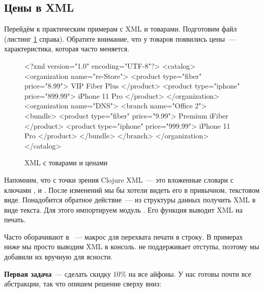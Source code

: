 \subsection{Цены в XML}


Перейдём к практическим примерам с XML и товарами. Подготовим файл
 (листинг \ref{fig:chart-xml-01} справа). Обратите
внимание, что у товаров появились цены~--- характеристика, которая часто
меняется.

\begin{figure}[ht!]

\begin{english}
  \begin{xml}
<?xml version="1.0" encoding="UTF-8"?>
<catalog>
  <organization name="re-Store">
    <product type="fiber" price="8.99">
      VIP Fiber Plus
    </product>
    <product type="iphone" price="899.99">
      iPhone 11 Pro
    </product>
  </organization>
  <organization name="DNS">
    <branch name="Office 2">
      <bundle>
        <product type="fiber" price="9.99">
          Premium iFiber
        </product>
        <product type="iphone" price="999.99">
          iPhone 11 Pro
        </product>
      </bundle>
    </branch>
  </organization>
</catalog>
  \end{xml}
\end{english}

\captionsetup{labelformat=lis}
\caption{XML с товарами и ценами}

\label{fig:chart-xml-01}

\end{figure}

Напомним, что с точки зрения Clojure XML~--- это вложенные словари с ключами
,  и . После изменений мы бы хотели видеть его в
привычном, текстовом виде. Понадобится обратное действие~--- из структуры данных
получить XML в виде текста. Для этого импортируем модуль . Его
функция  выводит XML на печать.


Часто  оборачивают в ~--- макрос для перехвата печати в
строку. В примерах ниже мы просто выводим XML в консоль.  не поддерживает
отступы, поэтому мы добавили их вручную для ясности.

\textbf{Первая задача}~--- сделать скидку 10\% на все айфоны. У нас готовы почти все
абстракции, так что опишем решение сверху вниз:

